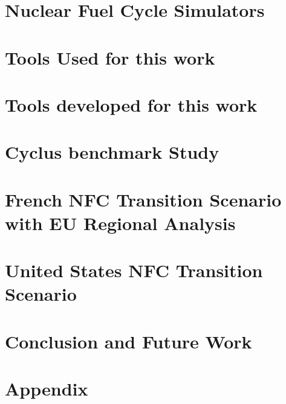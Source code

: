 \documentclass{report}
\begin{document}
\chapter{Nuclear Fuel Cycle Simulators}



\chapter{Tools Used for this work}



\chapter{Tools developed for this work}


\chapter{Cyclus benchmark Study}


\FloatBarrier


\chapter{French \gls{NFC} Transition Scenario with \gls{EU} Regional Analysis}



\chapter{United States \gls{NFC} Transition Scenario}


\chapter{Conclusion and Future Work}


\chapter{Appendix}






\end{document}
